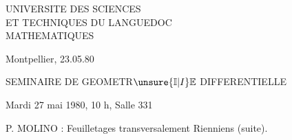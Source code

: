 
UNIVERSITE DES SCIENCES\\
ET TECHNIQUES DU LANGUEDOC\\
MATHEMATIQUES

Montpellier, 23.05.80

SEMINAIRE DE GEOMETR$\unsure{\mathbb I|I}\mathbb E$ DIFFERENTIELLE

Mardi 27 mai 1980, 10 h, Salle 331

P. MOLINO : Feuilletages transversalement Rienniens (suite).

